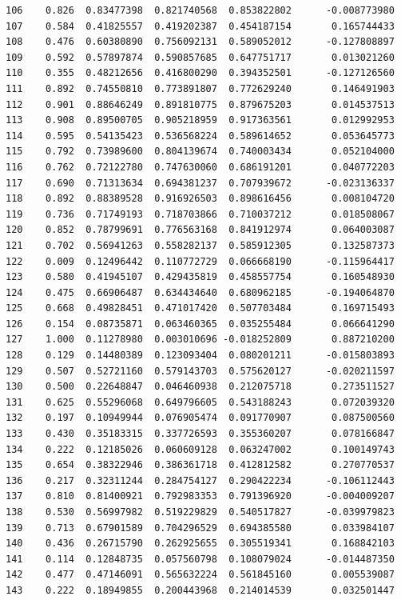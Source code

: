 \documentclass[
  letterpaper,
  DIV=11,
  numbers=noendperiod]{scrartcl}
\begin{document}
\begin{verbatim}
106    0.826  0.83477398  0.821740568  0.853822802      -0.008773980
107    0.584  0.41825557  0.419202387  0.454187154       0.165744433
108    0.476  0.60380890  0.756092131  0.589052012      -0.127808897
109    0.592  0.57897874  0.590857685  0.647751717       0.013021260
110    0.355  0.48212656  0.416800290  0.394352501      -0.127126560
111    0.892  0.74550810  0.773891807  0.772629240       0.146491903
112    0.901  0.88646249  0.891810775  0.879675203       0.014537513
113    0.908  0.89500705  0.905218959  0.917363561       0.012992953
114    0.595  0.54135423  0.536568224  0.589614652       0.053645773
115    0.792  0.73989600  0.804139674  0.740003434       0.052104000
116    0.762  0.72122780  0.747630060  0.686191201       0.040772203
117    0.690  0.71313634  0.694381237  0.707939672      -0.023136337
118    0.892  0.88389528  0.916926503  0.898616456       0.008104720
119    0.736  0.71749193  0.718703866  0.710037212       0.018508067
120    0.852  0.78799691  0.776563168  0.841912974       0.064003087
121    0.702  0.56941263  0.558282137  0.585912305       0.132587373
122    0.009  0.12496442  0.110772729  0.066668190      -0.115964417
123    0.580  0.41945107  0.429435819  0.458557754       0.160548930
124    0.475  0.66906487  0.634434640  0.680962185      -0.194064870
125    0.668  0.49828451  0.471017420  0.507703484       0.169715493
126    0.154  0.08735871  0.063460365  0.035255484       0.066641290
127    1.000  0.11278980  0.003010696 -0.018252809       0.887210200
128    0.129  0.14480389  0.123093404  0.080201211      -0.015803893
129    0.507  0.52721160  0.579143703  0.575620127      -0.020211597
130    0.500  0.22648847  0.046460938  0.212075718       0.273511527
131    0.625  0.55296068  0.649796605  0.543188243       0.072039320
132    0.197  0.10949944  0.076905474  0.091770907       0.087500560
133    0.430  0.35183315  0.337726593  0.355360207       0.078166847
134    0.222  0.12185026  0.060609128  0.063247002       0.100149743
135    0.654  0.38322946  0.386361718  0.412812582       0.270770537
136    0.217  0.32311244  0.284754127  0.290422234      -0.106112443
137    0.810  0.81400921  0.792983353  0.791396920      -0.004009207
138    0.530  0.56997982  0.519229829  0.540517827      -0.039979823
139    0.713  0.67901589  0.704296529  0.694385580       0.033984107
140    0.436  0.26715790  0.262925655  0.305519341       0.168842103
141    0.114  0.12848735  0.057560798  0.108079024      -0.014487350
142    0.477  0.47146091  0.565632224  0.561845160       0.005539087
143    0.222  0.18949855  0.200443968  0.214014539       0.032501447

\end{verbatim}
\end{document}
